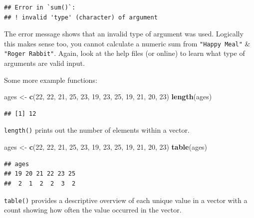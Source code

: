\documentclass[
]{book}
\newenvironment{Shaded}{\begin{snugshade}}{\end{snugshade}}
\newcommand{\DecValTok}[1]{\textcolor[rgb]{0.00,0.00,0.81}{#1}}
\newcommand{\FunctionTok}[1]{\textcolor[rgb]{0.13,0.29,0.53}{\textbf{#1}}}
\newcommand{\NormalTok}[1]{#1}
\newcommand{\OtherTok}[1]{\textcolor[rgb]{0.56,0.35,0.01}{#1}}
\begin{document}
\begin{verbatim}
## Error in `sum()`:
## ! invalid 'type' (character) of argument
\end{verbatim}

The error message shows that an invalid type of argument was used. Logically this makes sense too, you cannot calculate a numeric sum from \texttt{"Happy\ Meal"} \& \texttt{"Roger\ Rabbit"}. Again, look at the help files (or online) to learn what type of arguments are valid input.

Some more example functions:

\begin{Shaded}
\begin{Highlighting}[]
\NormalTok{ages }\OtherTok{\textless{}{-}} \FunctionTok{c}\NormalTok{(}\DecValTok{22}\NormalTok{, }\DecValTok{22}\NormalTok{, }\DecValTok{21}\NormalTok{, }\DecValTok{25}\NormalTok{, }\DecValTok{23}\NormalTok{, }\DecValTok{19}\NormalTok{, }\DecValTok{23}\NormalTok{, }\DecValTok{25}\NormalTok{, }\DecValTok{19}\NormalTok{, }\DecValTok{21}\NormalTok{, }\DecValTok{20}\NormalTok{, }\DecValTok{23}\NormalTok{)}
\FunctionTok{length}\NormalTok{(ages)}
\end{Highlighting}
\end{Shaded}

\begin{verbatim}
## [1] 12
\end{verbatim}

\texttt{length()} prints out the number of elements within a vector.

\begin{Shaded}
\begin{Highlighting}[]
\NormalTok{ages }\OtherTok{\textless{}{-}} \FunctionTok{c}\NormalTok{(}\DecValTok{22}\NormalTok{, }\DecValTok{22}\NormalTok{, }\DecValTok{21}\NormalTok{, }\DecValTok{25}\NormalTok{, }\DecValTok{23}\NormalTok{, }\DecValTok{19}\NormalTok{, }\DecValTok{23}\NormalTok{, }\DecValTok{25}\NormalTok{, }\DecValTok{19}\NormalTok{, }\DecValTok{21}\NormalTok{, }\DecValTok{20}\NormalTok{, }\DecValTok{23}\NormalTok{)}
\FunctionTok{table}\NormalTok{(ages)}
\end{Highlighting}
\end{Shaded}

\begin{verbatim}
## ages
## 19 20 21 22 23 25 
##  2  1  2  2  3  2
\end{verbatim}

\texttt{table()} provides a descriptive overview of each unique value in a vector with a count showing how often the value occurred in the vector.
\end{document}
